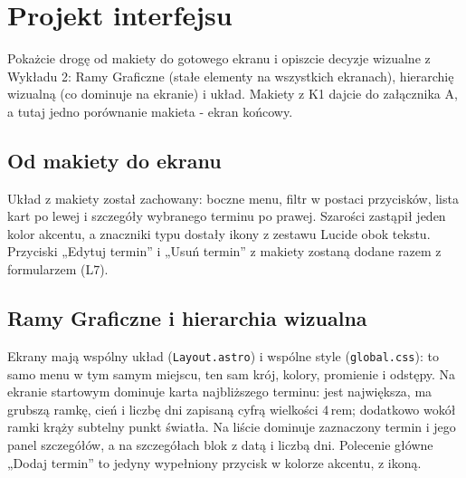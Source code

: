 \section{Projekt interfejsu}\label{sec:projekt}

\begin{instrukcja}[zalecane]
Pokażcie drogę od makiety do gotowego ekranu i opiszcie decyzje wizualne z Wykładu 2: Ramy Graficzne
(stałe elementy na wszystkich ekranach), hierarchię wizualną (co dominuje na ekranie) i układ.
Makiety z K1 dajcie do załącznika A, a tutaj jedno porównanie makieta - ekran końcowy.
\end{instrukcja}

\subsection{Od makiety do ekranu}
Układ z makiety został zachowany: boczne menu, filtr w postaci przycisków, lista kart po lewej
i szczegóły wybranego terminu po prawej. Szarości zastąpił jeden kolor akcentu, a znaczniki typu
dostały ikony z zestawu Lucide obok tekstu. Przyciski „Edytuj termin” i „Usuń termin” z makiety
zostaną dodane razem z formularzem (L7).

\subsection{Ramy Graficzne i hierarchia wizualna}
Ekrany mają wspólny układ (\texttt{Layout.astro}) i wspólne style
(\texttt{global.css}): to samo menu w tym samym miejscu, ten sam krój, kolory, promienie i odstępy.
Na ekranie startowym dominuje karta najbliższego terminu: jest największa, ma grubszą ramkę, cień
i liczbę dni zapisaną cyfrą wielkości 4\,rem; dodatkowo wokół ramki krąży subtelny punkt światła.
Na liście dominuje zaznaczony termin i jego panel szczegółów, a na szczegółach blok z datą i liczbą dni.
Polecenie główne „Dodaj termin” to jedyny wypełniony przycisk w kolorze akcentu, z ikoną.

